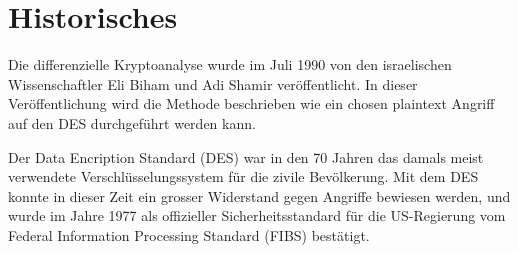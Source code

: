 \section{Historisches}\label{sec:Historisches}

Die differenzielle Kryptoanalyse wurde im Juli 1990 von den israelischen Wissenschaftler Eli Biham und Adi Shamir veröffentlicht. In dieser Veröffentlichung wird die Methode beschrieben wie ein chosen plaintext Angriff auf den DES durchgeführt werden kann.

Der Data Encription Standard (DES) war in den 70 Jahren das damals meist verwendete Verschlüsselungssystem für die zivile Bevölkerung. Mit dem DES konnte in dieser Zeit ein grosser Widerstand gegen Angriffe bewiesen werden, und wurde im Jahre 1977 als offizieller Sicherheitsstandard für die US-Regierung vom Federal Information Processing Standard (FIBS) bestätigt. 






